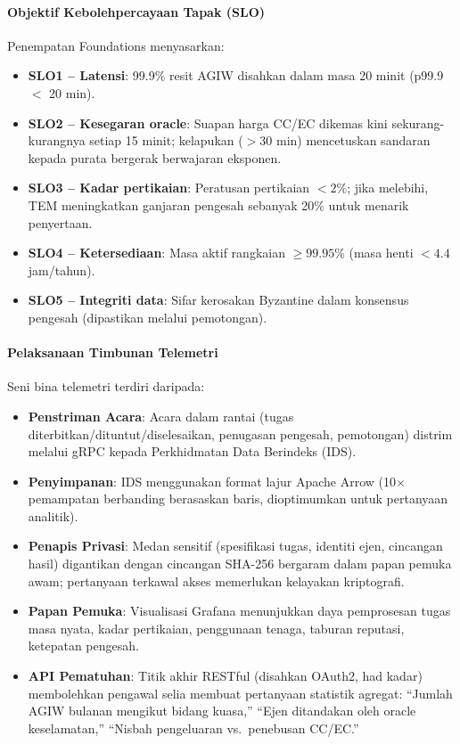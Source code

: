 \documentclass[11pt]{article}
\begin{document}
\paragraph{Objektif Kebolehpercayaan Tapak (SLO)} Penempatan Foundations menyasarkan:
\begin{itemize}[noitemsep]
  \item \textbf{SLO1 -- Latensi}: 99.9\% resit AGIW disahkan dalam masa 20 minit (p99.9 $<$ 20 min).
  \item \textbf{SLO2 -- Kesegaran oracle}: Suapan harga CC/EC dikemas kini sekurang-kurangnya setiap 15 minit; kelapukan ($>30$ min) mencetuskan sandaran kepada purata bergerak berwajaran eksponen.
  \item \textbf{SLO3 -- Kadar pertikaian}: Peratusan pertikaian $<2\%$; jika melebihi, TEM meningkatkan ganjaran pengesah sebanyak 20\% untuk menarik penyertaan.
  \item \textbf{SLO4 -- Ketersediaan}: Masa aktif rangkaian $\geq 99.95\%$ (masa henti $<4.4$ jam/tahun).
  \item \textbf{SLO5 -- Integriti data}: Sifar kerosakan Byzantine dalam konsensus pengesah (dipastikan melalui pemotongan).
\end{itemize}

\paragraph{Pelaksanaan Timbunan Telemetri} Seni bina telemetri terdiri daripada:
\begin{itemize}[noitemsep]
  \item \textbf{Penstriman Acara}: Acara dalam rantai (tugas diterbitkan/dituntut/diselesaikan, penugasan pengesah, pemotongan) distrim melalui gRPC kepada Perkhidmatan Data Berindeks (IDS).
  \item \textbf{Penyimpanan}: IDS menggunakan format lajur Apache Arrow (10$\times$ pemampatan berbanding berasaskan baris, dioptimumkan untuk pertanyaan analitik).
  \item \textbf{Penapis Privasi}: Medan sensitif (spesifikasi tugas, identiti ejen, cincangan hasil) digantikan dengan cincangan SHA-256 bergaram dalam papan pemuka awam; pertanyaan terkawal akses memerlukan kelayakan kriptografi.
  \item \textbf{Papan Pemuka}: Visualisasi Grafana menunjukkan daya pemprosesan tugas masa nyata, kadar pertikaian, penggunaan tenaga, taburan reputasi, ketepatan pengesah.
  \item \textbf{API Pematuhan}: Titik akhir RESTful (disahkan OAuth2, had kadar) membolehkan pengawal selia membuat pertanyaan statistik agregat: ``Jumlah AGIW bulanan mengikut bidang kuasa,'' ``Ejen ditandakan oleh oracle keselamatan,'' ``Nisbah pengeluaran vs.\ penebusan CC/EC.''
\end{itemize}
\end{document}
